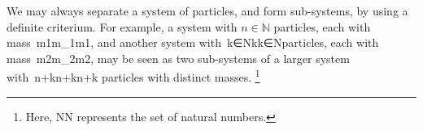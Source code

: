 We may always separate a system of particles, and form sub-systems, by using a definite criterium. For example, a system with $n\in\mathbb{N}$ particles, each with mass m1m_1m1​​, and another system with k∈Nk\in{}k∈N​ particles, each with mass m2m_2m2​​, may be seen as two sub-systems of a larger system with n+kn+kn+k​ particles with distinct masses. \footnote{Here, NN​ represents the set of natural numbers.}